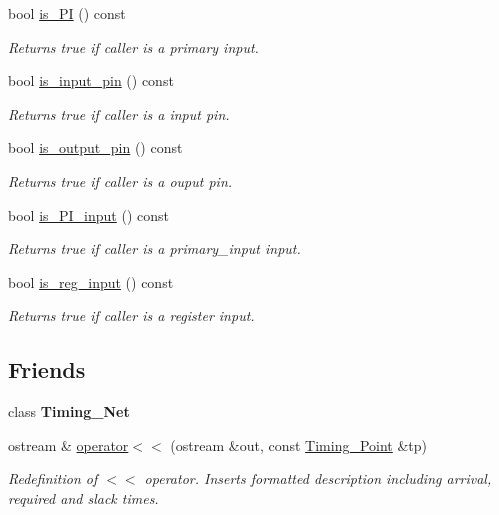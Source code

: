 \begin{DoxyCompactItemize}
bool \hyperlink{classTiming__Analysis_1_1Timing__Point_a0c943d53edbf2fbffa188ebf883a5b9f}{is\-\_\-\-P\-I} () const 
\begin{DoxyCompactList}\small\item\em Returns true if caller is a primary input. \end{DoxyCompactList}\item 
bool \hyperlink{classTiming__Analysis_1_1Timing__Point_aebb2497a057619c1cc9206253238f969}{is\-\_\-input\-\_\-pin} () const 
\begin{DoxyCompactList}\small\item\em Returns true if caller is a input pin. \end{DoxyCompactList}\item 
bool \hyperlink{classTiming__Analysis_1_1Timing__Point_a5c8883bd6dae6b49cb5c80e16b612d70}{is\-\_\-output\-\_\-pin} () const 
\begin{DoxyCompactList}\small\item\em Returns true if caller is a ouput pin. \end{DoxyCompactList}\item 
bool \hyperlink{classTiming__Analysis_1_1Timing__Point_a1353ea265660f4bada0367f9a0d4251c}{is\-\_\-\-P\-I\-\_\-input} () const 
\begin{DoxyCompactList}\small\item\em Returns true if caller is a primary\-\_\-input input. \end{DoxyCompactList}\item 
bool \hyperlink{classTiming__Analysis_1_1Timing__Point_aabcd5ebf7151be22c98753d16f26c84c}{is\-\_\-reg\-\_\-input} () const 
\begin{DoxyCompactList}\small\item\em Returns true if caller is a register input. \end{DoxyCompactList}\end{DoxyCompactItemize}
\subsection*{Friends}
\begin{DoxyCompactItemize}
\item 
\hypertarget{classTiming__Analysis_1_1Timing__Point_a2050314f5969ad9af0efe192b472b67a}{class {\bfseries Timing\-\_\-\-Net}}\label{classTiming__Analysis_1_1Timing__Point_a2050314f5969ad9af0efe192b472b67a}

\item 
ostream \& \hyperlink{classTiming__Analysis_1_1Timing__Point_a9ff76c936a6e34e8de6e1335f9d94663}{operator$<$$<$} (ostream \&out, const \hyperlink{classTiming__Analysis_1_1Timing__Point}{Timing\-\_\-\-Point} \&tp)
\begin{DoxyCompactList}\small\item\em Redefinition of $<$$<$ operator. Inserts formatted description including arrival, required and slack times. \end{DoxyCompactList}\end{DoxyCompactItemize}


